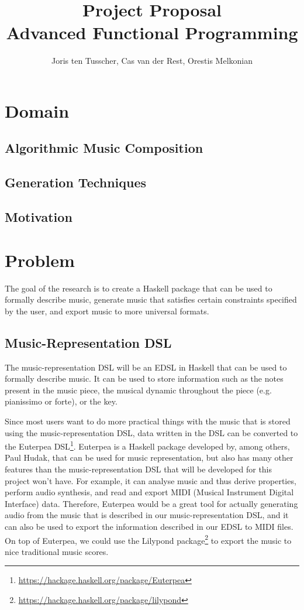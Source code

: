 \documentclass[12pt,a4paper]{article}
\title{\textbf{Project Proposal \\ \small{Advanced Functional Programming}}}
\author{\small{Joris ten Tusscher, Cas van der Rest, Orestis Melkonian}}
\date{}
\newcommand{\site}[1]{\footnote{\url{#1}}}
\begin{document}
\maketitle

\section{Domain}

\subsection{Algorithmic Music Composition}
\subsection{Generation Techniques}
\subsection{Motivation}
\cite{categorial}

\section{Problem}
The goal of the research is to create a Haskell package that can be used to formally describe music, generate music that satisfies certain constraints specified by the user, and export music to more universal formats.

\subsection{Music-Representation DSL}
The music-representation DSL will be an EDSL in Haskell that can be used to formally describe music. It can be used to store information such as the notes present in the music piece, the musical dynamic throughout the piece (e.g. pianissimo or forte), or the key.

Since most users want to do more practical things with the music that is stored using the music-representation DSL, data written in the DSL can be converted to the Euterpea DSL\site{https://hackage.haskell.org/package/Euterpea}. Euterpea is a Haskell package developed by, among others, Paul Hudak, that can be used for music representation, but also has many other features than the music-representation DSL that will be developed for this project won't have. For example, it can analyse music and thus derive properties, perform audio synthesis, and read and export MIDI (Musical Instrument Digital Interface) data. Therefore, Euterpea would be a great tool for actually generating audio from the music that is described in our music-representation DSL, and it can also be used to export the information described in our EDSL to MIDI files. On top of Euterpea, we could use the Lilypond package\site{https://hackage.haskell.org/package/lilypond} to export the music to nice traditional music scores.
\end{document}
